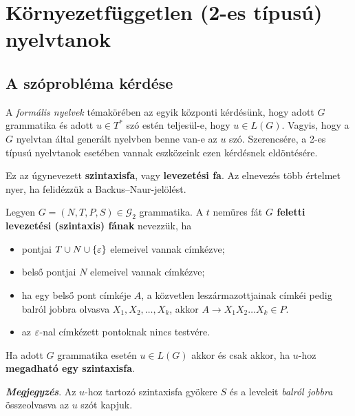 \chapter{Környezetfüggetlen (2-es típusú) nyelvtanok}

\section{A szóprobléma kérdése}

A \textit{formális nyelvek} témakörében az egyik központi kérdésünk, hogy adott $G$ grammatika és adott $u \in T^*$ szó estén teljesül-e, hogy $u \in L(G)$. Vagyis, hogy a $G$ nyelvtan által generált nyelvben benne van-e az $u$ szó. Szerencsére, a 2-es típusú nyelvtanok esetében vannak eszközeink ezen kérdésnek eldöntésére.

Ez az úgynevezett \textbf{szintaxisfa}, vagy \textbf{levezetési fa}. Az elnevezés több értelmet nyer, ha felidézzük a Backus--Naur-jelölést.

\begin{tcolorbox}
	\begin{definition}[Szintaxisfa]
		Legyen $G = (N,T,P,S) \in \mathcal{G}_2$ grammatika.
		A $t$ nemüres fát \textbf{$G$ feletti levezetési (szintaxis) fának}
		nevezzük, ha
		\begin{itemize}
			\item pontjai $T \cup N \cup \{\varepsilon\}$ elemeivel vannak címkézve;
			\item belső pontjai $N$ elemeivel vannak címkézve;
			\item ha egy belső pont címkéje $A$, a közvetlen
			leszármazottjainak címkéi pedig balról jobbra olvasva
			$X_1, X_2, \dots, X_k$, akkor $A \longrightarrow X_1X_2\dots X_k \in P$.
			\item az $\varepsilon$-nal címkézett pontoknak nincs testvére.
		\end{itemize}
	\end{definition}
\end{tcolorbox}

\begin{tcolorbox}
	\begin{theorem}
		Ha adott $G$ grammatika esetén $u \in L(G)$ akkor és csak
		akkor, ha $u$-hoz \textbf{megadható egy szintaxisfa}.
	\end{theorem}
\end{tcolorbox}

\textbf{\textit{Megjegyzés}}. Az $u$-hoz tartozó szintaxisfa gyökere $S$ és
a leveleit \textit{balról jobbra} összeolvasva az $u$ szót kapjuk.

